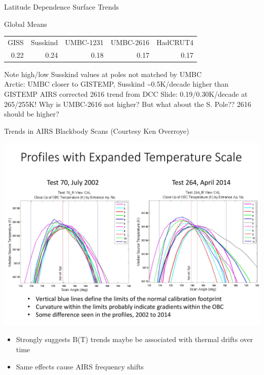 \documentclass[10pt,t]{beamer}
\begin{document}
\begin{frame}[label={sec:org540bbdf}]{Latitude Dependence Surface Trends}
\vspace{-0.15in}
\begin{footnotesize}
Global Means
\vspace{-0.1in}
\begin{center}
\begin{tabular}{rrrrr}
GISS & Susskind & UMBC-1231 & UMBC-2616 & HadCRUT4\\
0.22 & 0.24 & 0.18 & 0.17 & 0.17\\
\end{tabular}
\end{center}
\vspace{-0.03in}
\end{footnotesize}
\begin{footnotesize}
Note high/low Susskind values at poles not matched by UMBC\\
Arctic: UMBC closer to GISTEMP, Susskind \textasciitilde{}0.5K/decade higher than GISTEMP
AIRS corrected 2616 trend from DCC Slide: 0.19/0.30K/decade at 265/255K!
Why is UMBC-2616 not higher?
But what about the S. Pole??  2616 should be higher?
\end{footnotesize}
\end{frame}

\begin{frame}[label={sec:orgfb56a29}]{Trends in AIRS Blackbody Scans (Courtesy Ken Overroye)}
\vspace{-0.1in}
\begin{center}
\includegraphics[width=0.8\linewidth]{./Figs/Pdf/overroye_scan.pdf}
\end{center}

\begin{small}
\begin{itemize}
\item Strongly suggests B(T) trends maybe be associated with thermal drifts over time
\item Same effects cause AIRS frequency shifts
\end{itemize}
\end{small}
\end{frame}
\end{document}
